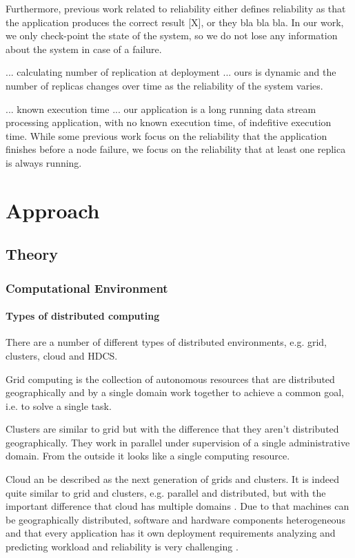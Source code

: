 \documentclass{cslthse-msc}
\begin{document}
Furthermore, previous work related to reliability either defines reliability as that the application produces the correct result [X], or they bla bla bla. In our work, we only check-point the state of the system, so we do not lose any information about the system in case of a failure. 

... calculating number of replication at deployment ... ours is dynamic and the number of replicas changes over time as the reliability of the system varies.

... known execution time ... our application is a long running data stream processing application, with no known execution time, of indefitive execution time. While some previous work focus on the reliability that the application finishes before a node failure, we focus on the reliability that at least one replica is always running.

\chapter{Approach} \label{ch:approach}
\section{Theory} \label{sec:theory}
\subsection{Computational Environment}
\subsubsection{Types of distributed computing}
There are a number of different types of distributed environments, e.g. grid, clusters, cloud and HDCS.

Grid computing is the collection of autonomous resources that are distributed geographically and by a single domain work together to achieve a common goal, i.e. to solve a single task. 

Clusters are similar to grid but with the difference that they aren't distributed geographically. They work in parallel under supervision of a single administrative domain. From the outside it looks like a single computing resource. 

Cloud an be described as the next generation of grids and clusters. It is indeed quite similar to grid and clusters, e.g. parallel and distributed, but with the important difference that cloud has multiple domains \cite{compStudyLoadAndCloud}. Due to that machines can be geographically distributed, software and hardware components heterogeneous and that every application has it own deployment requirements analyzing and predicting workload and reliability is very challenging \cite{surveyReliabilityDistr}. 
\end{document}
